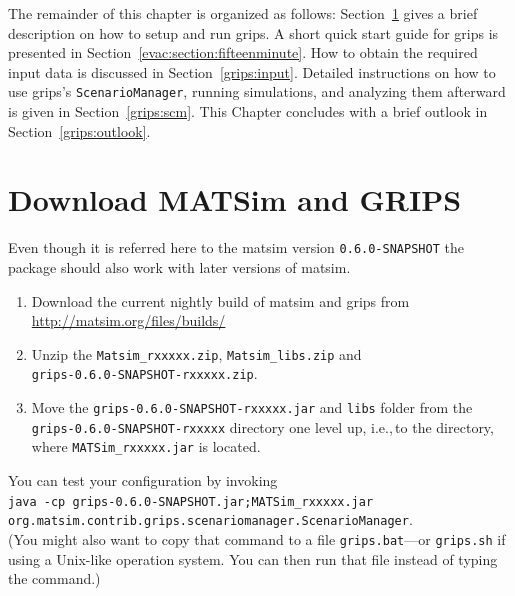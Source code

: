The remainder of this chapter is organized as follows: Section~\ref{grips:install} gives a brief description on how to setup and run \gls{grips}. 
A short quick start guide for \gls{grips} is presented in Section~\ref{evac:section:fifteenminute}. How to obtain the required input data is discussed in Section~\ref{grips:input}. Detailed instructions on how to use \gls{grips}'s \lstinline|ScenarioManager|, running simulations, and analyzing them afterward is given in Section~\ref{grips:scm}. This Chapter concludes with a brief outlook in Section~\ref{grips:outlook}.

\section{Download MATSim and GRIPS}
\label{grips:install}
Even though it is referred here to the \gls{matsim} version \lstinline|0.6.0-SNAPSHOT| the package should also work with later versions of \gls{matsim}.
\begin{enumerate}
\item 
Download the current nightly build of \gls{matsim} and \gls{grips} from
\url{http://matsim.org/files/builds/}
\item 
Unzip the \lstinline|Matsim_rxxxxx.zip|, \lstinline|Matsim_libs.zip| and\\
 \lstinline|grips-0.6.0-SNAPSHOT-rxxxxx.zip|.
\item 
Move the \lstinline|grips-0.6.0-SNAPSHOT-rxxxxx.jar| and \lstinline|libs| folder from the \lstinline|grips-0.6.0-SNAPSHOT-rxxxxx| directory one level up, 
i.e.,\,to the directory, where \lstinline|MATSim_rxxxxx.jar| is located.
\end{enumerate}

You can test your configuration by invoking\\ 
\lstinline|java -cp grips-0.6.0-SNAPSHOT.jar;MATSim_rxxxxx.jar|\\ \lstinline|org.matsim.contrib.grips.scenariomanager.ScenarioManager|.\\
(You might also want to copy that command to a file \lstinline|grips.bat|---or \lstinline|grips.sh| if using a Unix-like operation system. You can then run that file instead of typing the command.)

